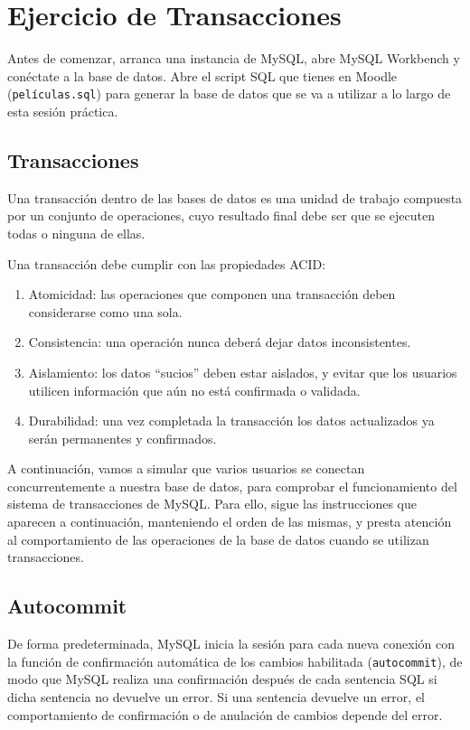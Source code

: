 \documentclass[a4paper]{article}
\begin{document}
\section*{Ejercicio de Transacciones}

Antes de comenzar, arranca una instancia de MySQL, abre MySQL Workbench y conéctate a la base de datos. Abre el script SQL que tienes en Moodle (\texttt{películas.sql}) para generar la base de datos que se va a utilizar a lo largo de esta sesión práctica.

\subsection*{Transacciones}

Una transacción dentro de las bases de datos es una unidad de trabajo compuesta por un conjunto de operaciones, cuyo resultado final debe ser que se ejecuten todas o ninguna de ellas.

Una transacción debe cumplir con las propiedades ACID:

\begin{enumerate}
    \item Atomicidad: las operaciones que componen una transacción deben considerarse como una sola.
    \item Consistencia: una operación nunca deberá dejar datos inconsistentes.
    \item Aislamiento: los datos ``sucios'' deben estar aislados, y evitar que los usuarios utilicen información que aún no está confirmada o validada.
    \item Durabilidad: una vez completada la transacción los datos actualizados ya serán permanentes y confirmados.
\end{enumerate}

A continuación, vamos a simular que varios usuarios se conectan concurrentemente a nuestra base de datos, para comprobar el funcionamiento del sistema de transacciones de MySQL. Para ello, sigue las instrucciones que aparecen a continuación, manteniendo el orden de las mismas, y presta atención al comportamiento de las operaciones de la base de datos cuando se utilizan transacciones.

\subsection*{Autocommit}

De forma predeterminada, MySQL inicia la sesión para cada nueva conexión con la función de confirmación automática de los cambios habilitada (\texttt{autocommit}), de modo que MySQL realiza una confirmación después de cada sentencia SQL si dicha sentencia no devuelve un error. Si una sentencia devuelve un error, el comportamiento de confirmación o de anulación de cambios depende del error.
\end{document}
